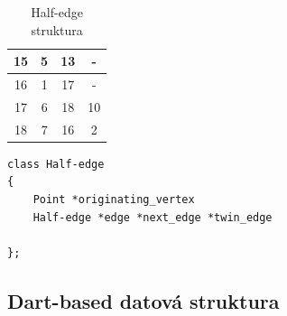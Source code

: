 \documentclass[12pt,a4paper]{article}
\begin{document}
\begin{table}[h]
\begin{tabular}{|c||c||c|c|}
15                         & 5                                 & 13                         & -         \\ \hline
16                         & 1                                 & 17                         & -         \\ \hline
17                         & 6                                 & 18                         & 10        \\ \hline
18                         & 7                                 & 16                         & 2         \\ \hline
\end{tabular}
\caption{Half-edge struktura}
\label{tab:half_edge}
\end{table}

\bigskip
\begin{lstlisting}[caption={Definice datové struktury}]
class Half-edge
{
	Point *originating_vertex
	Half-edge *edge *next_edge *twin_edge
	
};
\end{lstlisting}

\newpage
\subsection{Dart-based datová struktura}
\end{document}
